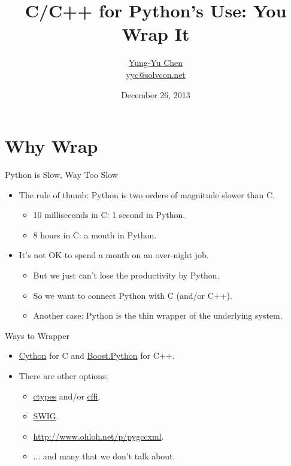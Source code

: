 \documentclass[dvips,xcolor=pst,14pt]{beamer}
\title[C/C++/Python]{C/C++ for Python's Use: You Wrap It}
\author[\href{http://solvcon.net/yyc/}{Yung-Yu Chen}]%
{\href{http://solvcon.net/yyc/}{Yung-Yu Chen} \\ {\scriptsize
\url{yyc@solvcon.net}}}
\institute[THF]{The Happy Folk}
\date[2013/12/26]{December 26, 2013}
\begin{document}
\begin{frame}
\titlepage
\end{frame}


\section{
Why Wrap
}

\begin{frame}{
%
Python is Slow, Way Too Slow
%
}
\begin{itemize}
\item The rule of thumb: Python is \alert{two orders of magnitude slower} than
C.
\begin{itemize}
  \item 10 milliseconds in C: 1 second in Python.
  \item 8 hours in C: a month in Python.
\end{itemize}
\item It's not OK to spend a month on an over-night job.
\begin{itemize}
  \item But we just can't lose the productivity by Python.
  \item So we want to connect Python with C (and/or C++).
  \item Another case: Python is the thin wrapper of the underlying system.
\end{itemize}
\end{itemize}
\end{frame}

\begin{frame}{
%
Ways to Wrapper
%
}
\begin{itemize}
\item \href{http://cython.org/}{\alert{Cython}} for C and
\href{http://www.boost.org/doc/libs/1_55_0/libs/python/doc/}%
{\alert{Boost.Python}} for C++.
\item There are other options:
\begin{itemize}
  \item \href{http://docs.python.org/2/library/ctypes.html}{ctypes} and/or
  \href{https://bitbucket.org/cffi/cffi}{cffi}.
  \item \href{http://www.swig.org/}{SWIG}.
  \item \href{Py++}{http://www.ohloh.net/p/pygccxml}.
  \item ... and many that we don't talk about.
\end{itemize}
\end{itemize}
\end{frame}
\end{document}
